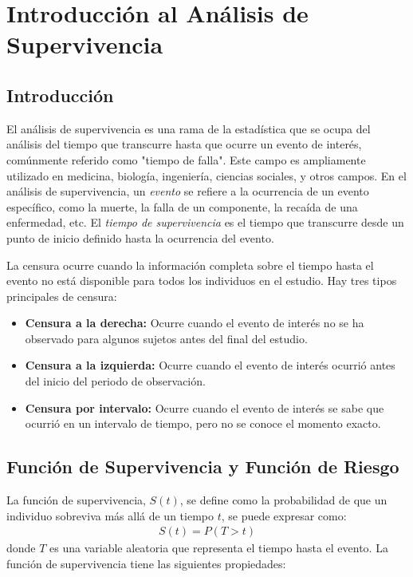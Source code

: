 \documentclass[a4paper]{report} %
\begin{document}
\chapter{Introducci\'on al An\'alisis de Supervivencia}

\section*{Introducción}
El an\'alisis de supervivencia es una rama de la estad\'istica que se ocupa del an\'alisis del tiempo que transcurre hasta que ocurre un evento de inter\'es, com\'unmente referido como "tiempo de falla". Este campo es ampliamente utilizado en medicina, biolog\'ia, ingenier\'ia, ciencias sociales, y otros campos. En el an\'alisis de supervivencia, un \textit{evento} se refiere a la ocurrencia de un evento espec\'ifico, como la muerte, la falla de un componente, la reca\'ida de una enfermedad, etc. El \textit{tiempo de supervivencia} es el tiempo que transcurre desde un punto de inicio definido hasta la ocurrencia del evento.

La censura ocurre cuando la informaci\'on completa sobre el tiempo hasta el evento no est\'a disponible para todos los individuos en el estudio. Hay tres tipos principales de censura:
\begin{itemize}
    \item \textbf{Censura a la derecha:} Ocurre cuando el evento de inter\'es no se ha observado para algunos sujetos antes del final del estudio.
    \item \textbf{Censura a la izquierda:} Ocurre cuando el evento de inter\'es ocurri\'o antes del inicio del periodo de observaci\'on.
    \item \textbf{Censura por intervalo:} Ocurre cuando el evento de inter\'es se sabe que ocurri\'o en un intervalo de tiempo, pero no se conoce el momento exacto.
\end{itemize}
\section*{Funci\'on de Supervivencia y Funci\'on de Riesgo}
La funci\'on de supervivencia, $S(t)$, se define como la probabilidad de que un individuo sobreviva m\'as all\'a de un tiempo $t$, se puede expresar como:
\begin{eqnarray}
S(t) = P(T > t)
\end{eqnarray}
donde $T$ es una variable aleatoria que representa el tiempo hasta el evento. La funci\'on de supervivencia tiene las siguientes propiedades:
\end{document}
